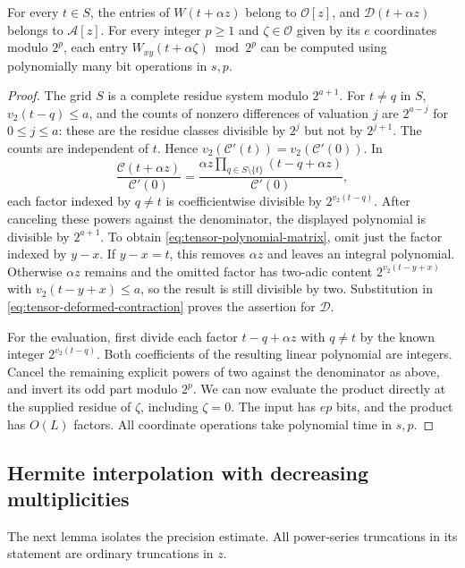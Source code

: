 \begin{lemma}\label{lem:tensor-integrality}
For every $t\in S$, the entries of $W(t+\alpha z)$ belong to
$\mathcal O[z]$, and $\mathcal D(t+\alpha z)$ belongs to $\mathcal A[z]$.
For every integer $p\ge1$ and $\zeta\in\mathcal O$ given by its
$e$ coordinates modulo $2^p$, each entry
$W_{xy}(t+\alpha\zeta)\bmod 2^p$ can be computed using polynomially
many bit operations in $s,p$.
\end{lemma}
\begin{proof}
The grid $S$ is a complete residue system modulo $2^{a+1}$.
For $t\ne q$ in $S$, $v_2(t-q)\le a$, and the counts of nonzero
differences of valuation $j$ are $2^{a-j}$ for $0\le j\le a$:
these are the residue classes divisible by $2^j$ but not by
$2^{j+1}$. The counts are independent of $t$. Hence
$v_2(\mathcal C'(t))=v_2(\mathcal C'(0))$.
In
\[
 \frac{\mathcal C(t+\alpha z)}{\mathcal C'(0)}
  =\frac{\alpha z\prod_{q\in S\setminus\{t\}}
                         (t-q+\alpha z)}{\mathcal C'(0)},
\]
each factor indexed by $q\ne t$ is coefficientwise divisible by
$2^{v_2(t-q)}$.  After canceling these powers against the
denominator, the displayed polynomial is divisible by $2^{a+1}$.
To obtain \eqref{eq:tensor-polynomial-matrix}, omit just the factor indexed by
$y-x$. If $y-x=t$, this removes $\alpha z$ and leaves an integral
polynomial. Otherwise $\alpha z$ remains and the omitted factor has
two-adic content $2^{v_2(t-y+x)}$ with $v_2(t-y+x)\le a$, so the
result is still divisible by two. Substitution in
\eqref{eq:tensor-deformed-contraction} proves the assertion for $\mathcal D$.

For the evaluation, first divide each factor
$t-q+\alpha z$ with $q\ne t$ by the known integer $2^{v_2(t-q)}$.
Both coefficients of the resulting linear polynomial are integers.
Cancel the remaining explicit powers of two against the denominator
as above, and invert its odd part modulo $2^p$. We can now evaluate
the product directly at the supplied residue of $\zeta$, including
$\zeta=0$. The input has $ep$ bits, and the product has $O(L)$
factors. All coordinate operations take polynomial time in $s,p$.
\end{proof}

\subsection{Hermite interpolation with decreasing multiplicities}
\label{subsec:tensor-hermite}

The next lemma isolates the precision estimate.  All power-series
truncations in its statement are ordinary truncations in $z$.

